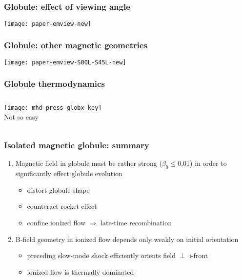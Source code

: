 \documentclass{beamer}
\begin{document}
\begin{frame}
  \frametitle{Globule: effect of viewing angle}
  \texttt{[image: paper-emview-new]}
\end{frame}


\begin{frame}
  \frametitle{Globule: other magnetic geometries}
  \texttt{[image: paper-emview-S00L-S45L-new]}
\end{frame}

\begin{frame}
  \frametitle{Globule thermodynamics}\smallskip
  \color{red!50!orange}
  \begin{columns}
  \texttt{[image: mhd-press-globx-key]}
    \\ \medskip
    Not so easy
    \vspace*{3\baselineskip}
  \end{columns}
\end{frame}
\begin{frame}
  \frametitle{Isolated magnetic globule: summary}
  \linespread{1.3}\selectfont
  \begin{enumerate}
  \item Magnetic field in globule must be rather strong ($\beta_0 \le
    0.01$) in order to significantly effect globule evolution
    \begin{itemize}
    \item distort globule shape
    \item counteract rocket effect
    \item confine ionized flow $\Rightarrow$ late-time recombination
    \end{itemize}
  \item B-field geometry in ionized flow depends only weakly on
    initial orientation
    \begin{itemize}
    \item preceding slow-mode shock efficiently orients field $\perp$ i-front
    \item ionized flow is thermally dominated
    \end{itemize}
  \end{enumerate}
\end{frame}
\end{document}

